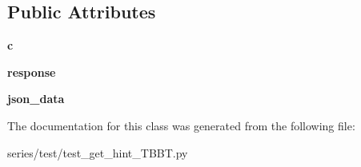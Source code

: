 \subsection*{Public Attributes}
\begin{DoxyCompactItemize}
\item 
\mbox{\label{classseries_1_1test_1_1test__get__hint___t_b_b_t_1_1_get_hint_test_t_b_b_t_a9dcbb674c637f6363b2661fff838185b}} 
{\bfseries c}
\item 
\mbox{\label{classseries_1_1test_1_1test__get__hint___t_b_b_t_1_1_get_hint_test_t_b_b_t_a6a98e73c08c00d9b6cc5e4cfa55f52ac}} 
{\bfseries response}
\item 
\mbox{\label{classseries_1_1test_1_1test__get__hint___t_b_b_t_1_1_get_hint_test_t_b_b_t_a7b403acbedacbeb69f561e1f38af8b87}} 
{\bfseries json\+\_\+data}
\end{DoxyCompactItemize}


The documentation for this class was generated from the following file\+:\begin{DoxyCompactItemize}
\item 
series/test/test\+\_\+get\+\_\+hint\+\_\+\+T\+B\+B\+T.\+py\end{DoxyCompactItemize}
